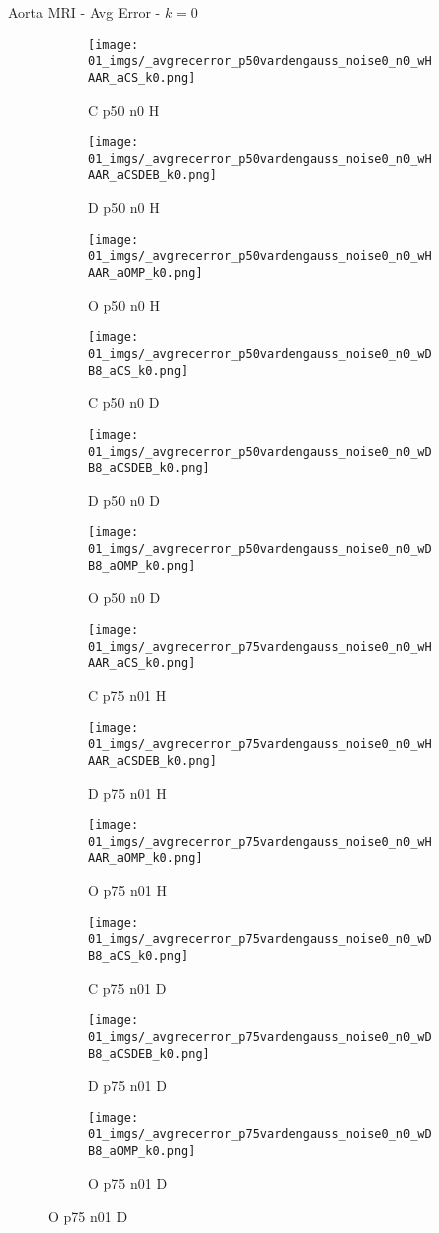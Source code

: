 \begin{frame}{Aorta MRI - Avg Error - $k=0$}{}
\begin{figure}
\begin{subfigure}{0.13\textwidth}
\texttt{[image: 01\_imgs/\_avgrecerror\_p50vardengauss\_noise0\_n0\_wHAAR\_aCS\_k0.png]}
\caption*{\tiny C p50 n0 H}
\end{subfigure}
\begin{subfigure}{0.13\textwidth}
\texttt{[image: 01\_imgs/\_avgrecerror\_p50vardengauss\_noise0\_n0\_wHAAR\_aCSDEB\_k0.png]}
\caption*{\tiny D p50 n0 H}
\end{subfigure}
\begin{subfigure}{0.13\textwidth}
\texttt{[image: 01\_imgs/\_avgrecerror\_p50vardengauss\_noise0\_n0\_wHAAR\_aOMP\_k0.png]}
\caption*{\tiny O p50 n0 H}
\end{subfigure}
\begin{subfigure}{0.13\textwidth}
\texttt{[image: 01\_imgs/\_avgrecerror\_p50vardengauss\_noise0\_n0\_wDB8\_aCS\_k0.png]}
\caption*{\tiny C p50 n0 D}
\end{subfigure}
\begin{subfigure}{0.13\textwidth}
\texttt{[image: 01\_imgs/\_avgrecerror\_p50vardengauss\_noise0\_n0\_wDB8\_aCSDEB\_k0.png]}
\caption*{\tiny D p50 n0 D}
\end{subfigure}
\begin{subfigure}{0.13\textwidth}
\texttt{[image: 01\_imgs/\_avgrecerror\_p50vardengauss\_noise0\_n0\_wDB8\_aOMP\_k0.png]}
\caption*{\tiny O p50 n0 D}
\end{subfigure}

\vspace{5pt}

\begin{subfigure}{0.13\textwidth}
\texttt{[image: 01\_imgs/\_avgrecerror\_p75vardengauss\_noise0\_n0\_wHAAR\_aCS\_k0.png]}
\caption*{\tiny C p75 n01 H}
\end{subfigure}
\begin{subfigure}{0.13\textwidth}
\texttt{[image: 01\_imgs/\_avgrecerror\_p75vardengauss\_noise0\_n0\_wHAAR\_aCSDEB\_k0.png]}
\caption*{\tiny D p75 n01 H}
\end{subfigure}
\begin{subfigure}{0.13\textwidth}
\texttt{[image: 01\_imgs/\_avgrecerror\_p75vardengauss\_noise0\_n0\_wHAAR\_aOMP\_k0.png]}
\caption*{\tiny O p75 n01 H}
\end{subfigure}
\begin{subfigure}{0.13\textwidth}
\texttt{[image: 01\_imgs/\_avgrecerror\_p75vardengauss\_noise0\_n0\_wDB8\_aCS\_k0.png]}
\caption*{\tiny C p75 n01 D}
\end{subfigure}
\begin{subfigure}{0.13\textwidth}
\texttt{[image: 01\_imgs/\_avgrecerror\_p75vardengauss\_noise0\_n0\_wDB8\_aCSDEB\_k0.png]}
\caption*{\tiny D p75 n01 D}
\end{subfigure}
\begin{subfigure}{0.13\textwidth}
\texttt{[image: 01\_imgs/\_avgrecerror\_p75vardengauss\_noise0\_n0\_wDB8\_aOMP\_k0.png]}
\caption*{\tiny O p75 n01 D}
\end{subfigure}


\end{figure}
\end{frame}
